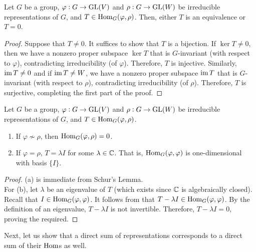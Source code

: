 		\begin{flem}
			\label{lem: schurs lemma}
			Let $G$ be a group, $\varphi : G \to \operatorname{GL}(V)$ and $\rho : G \to \operatorname{GL}(W)$ be irreducible representations of $G$, and $T \in \operatorname{Hom}_G(\varphi,\rho)$. Then, either $T$ is an equivalence or $T = 0$.
		\end{flem}
		\begin{proof}
			Suppose that $T \ne 0$. It suffices to show that $T$ is a bijection. If $\ker T \ne 0$, then we have a nonzero proper subspace $\ker T$ that is $G$-invariant (with respect to $\varphi$), contradicting irreducibility (of $\varphi$). Therefore, $T$ is injective. Similarly, $\operatorname{im} T \ne 0$ and if $\operatorname{im} T \ne W$, we have a nonzero proper subspace $\operatorname{im} T$ that is $G$-invariant (with respect to $\rho$), contradicting irreducibility (of $\rho$). Therefore, $T$ is surjective, completing the first part of the proof.
		\end{proof}

		\begin{fcor}
			\label{cor: schurs corollary}
			Let $G$ be a group, $\varphi : G \to \operatorname{GL}(V)$ and $\rho : G \to \operatorname{GL}(W)$ be irreducible representations of $G$, and $T \in \operatorname{Hom}_G(\varphi,\rho)$.
			\begin{enumerate}[label=(\alph*)]
				\item If $\varphi \not\sim \rho$, then $\operatorname{Hom}_G(\varphi,\rho) = 0$.
				\item If $\varphi = \rho$, $T = \lambda I$ for some $\lambda \in \mathbb{C}$. That is, $\operatorname{Hom}_G (\varphi,\varphi)$ is one-dimensional with basis $\{I\}$.
			\end{enumerate}
		\end{fcor}
		\begin{proof}
			(a) is immediate from Schur's Lemma.\\
			For (b), let $\lambda$ be an eigenvalue of $T$ (which exists since $\mathbb{C}$ is algebraically closed). Recall that $I \in \operatorname{Hom}_G(\varphi,\varphi)$. It follows from  that $T - \lambda I \in \operatorname{Hom}_G(\varphi,\varphi)$. By the definition of an eigenvalue, $T - \lambda I$ is not invertible. Therefore, $T - \lambda I = 0$, proving the required.
		\end{proof}

		Next, let us show that a direct sum of representations corresponds to a direct sum of their $\operatorname{Hom}$s as well.

